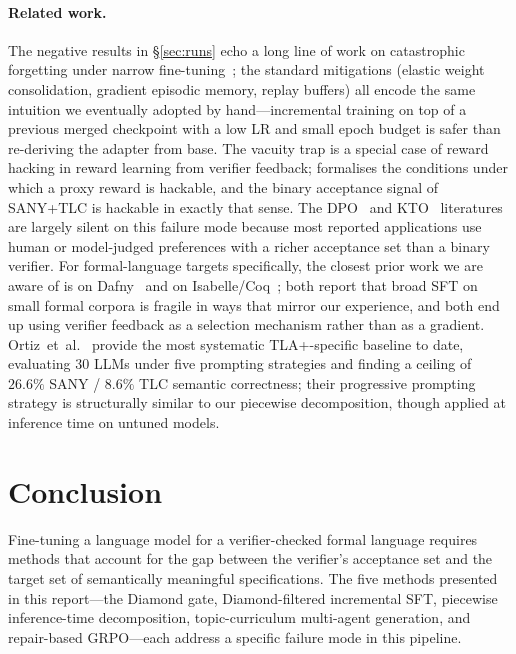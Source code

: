 \documentclass[11pt]{article}
\begin{document}
\paragraph{Related work.} The negative results in
\S\ref{sec:runs} echo a long line of work on catastrophic forgetting
under narrow fine-tuning~\cite{kirkpatrick2017ewc, lopez2017gem}; the
standard mitigations (elastic weight consolidation, gradient episodic
memory, replay buffers) all encode the same intuition we eventually
adopted by hand---incremental training on top of a previous merged
checkpoint with a low LR and small epoch budget is safer than
re-deriving the adapter from base. The vacuity trap is a special case
of reward hacking in reward learning from verifier feedback;
\cite{skalse2022defining} formalises the conditions under which a
proxy reward is hackable, and the binary acceptance signal of SANY+TLC
is hackable in exactly that sense. The DPO~\cite{rafailov2023direct}
and KTO~\cite{ethayarajh2024kto} literatures are largely silent on this
failure mode because most reported applications use human or
model-judged preferences with a richer acceptance set than a binary
verifier. For formal-language targets specifically, the closest prior
work we are aware of is on Dafny~\cite{misu2024towards} and on
Isabelle/Coq~\cite{first2023baldur}; both report that broad SFT on
small formal corpora is fragile in ways that mirror our experience,
and both end up using verifier feedback as a selection mechanism
rather than as a gradient. Ortiz~et~al.~\cite{ortiz2026formallm}
provide the most systematic TLA+-specific baseline to date, evaluating
$30$ LLMs under five prompting strategies and finding a ceiling of
$26.6\%$ SANY / $8.6\%$ TLC semantic correctness; their progressive
prompting strategy is structurally similar to our piecewise
decomposition, though applied at inference time on untuned models.

\section{Conclusion}
\label{sec:conclusion}

Fine-tuning a language model for a verifier-checked formal language
requires methods that account for the gap between the verifier's
acceptance set and the target set of semantically meaningful
specifications. The five methods presented in this report---the Diamond
gate, Diamond-filtered incremental SFT, piecewise inference-time
decomposition, topic-curriculum multi-agent generation, and repair-based
GRPO---each address a specific failure mode in this pipeline.
\end{document}
